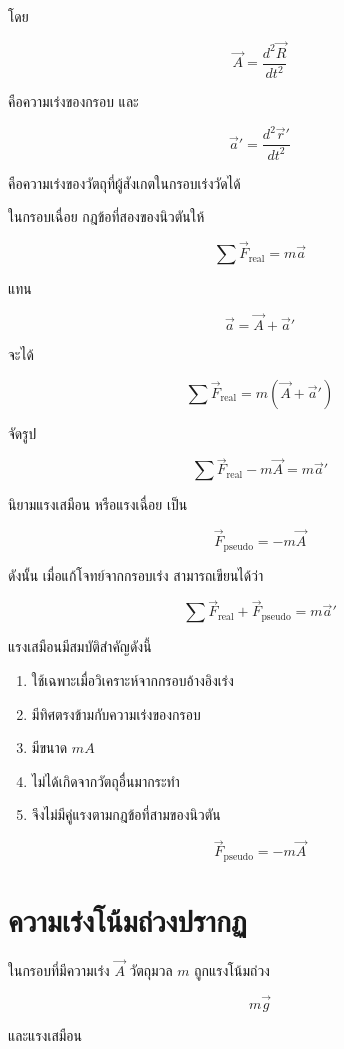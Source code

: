 โดย

\[
\vec A=\frac{d^2\vec R}{dt^2}
\]

คือความเร่งของกรอบ และ

\[
\vec a'=\frac{d^2\vec r'}{dt^2}
\]

คือความเร่งของวัตถุที่ผู้สังเกตในกรอบเร่งวัดได้

ในกรอบเฉื่อย กฎข้อที่สองของนิวตันให้

\[
\sum \vec F_{\text{real}}=m\vec a
\]

แทน

\[
\vec a=\vec A+\vec a'
\]

จะได้

\[
\sum \vec F_{\text{real}}
=
m(\vec A+\vec a')
\]

จัดรูป

\[
\sum \vec F_{\text{real}}-m\vec A
=
m\vec a'
\]

นิยามแรงเสมือน หรือแรงเฉื่อย เป็น

\[
\boxed{
\vec F_{\text{pseudo}}=-m\vec A
}
\]

ดังนั้น เมื่อแก้โจทย์จากกรอบเร่ง สามารถเขียนได้ว่า

\[
\boxed{
\sum \vec F_{\text{real}}
+
\vec F_{\text{pseudo}}
=
m\vec a'
}
\]

\begin{tcolorbox}[title=สมบัติของแรงเสมือน]
แรงเสมือนมีสมบัติสำคัญดังนี้

\begin{enumerate}
    \item ใช้เฉพาะเมื่อวิเคราะห์จากกรอบอ้างอิงเร่ง
    \item มีทิศตรงข้ามกับความเร่งของกรอบ
    \item มีขนาด $mA$
    \item ไม่ได้เกิดจากวัตถุอื่นมากระทำ
    \item จึงไม่มีคู่แรงตามกฎข้อที่สามของนิวตัน
\end{enumerate}

\[
\boxed{
\vec F_{\text{pseudo}}=-m\vec A
}
\]
\end{tcolorbox}

\section{ความเร่งโน้มถ่วงปรากฏ}

ในกรอบที่มีความเร่ง $\vec A$ วัตถุมวล $m$ ถูกแรงโน้มถ่วง

\[
m\vec g
\]

และแรงเสมือน

